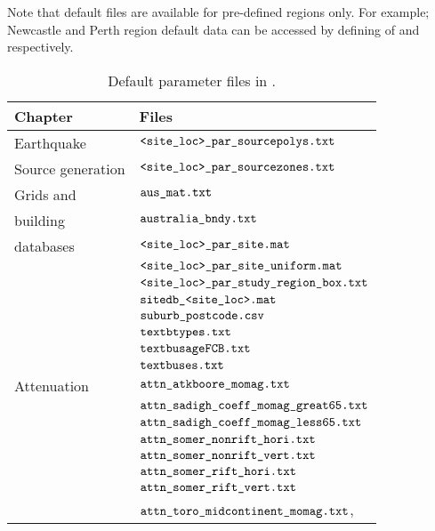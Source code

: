 Note that default files are available for pre-defined regions
only. For example; Newcastle and Perth region default data can be
accessed by defining  of \typenewc and
\typeperth respectively.

\begin{table}
\caption{Default parameter files in
.}
\label{tab:app-inputfiles} \vspace{0.8em}
\begin{tabular}{|l|p{}|}
\hline
Chapter & Files \\
\hline Earthquake & $\typeparfile{<site\_loc>}{\_par}{\_sourcepolys}{.txt}$ \\
Source generation &  $\typeparfile{<site\_loc>}{\_par}{\_sourcezones}{.txt}$ \\
\hline
Grids and & $\typeparfile{au}{s}{\_mat}{.txt}$\\
building & $\typeparfile{aust}{ralia}{\_bndy}{.txt}$\\
databases & $\typeparfile{<site\_loc>}{\_par}{\_site}{.mat}$\\
 &  $\typeparfile{<site\_loc>}{\_par\_site}{\_uniform}{.mat}$ \\
 &  $\typeparfile{<site\_loc>}{\_par\_study}{\_region\_box}{.txt}$ \\
  & $\typeparfile{sitedb}{\_<site}{\_loc>}{.mat}$ \\
 & $\typeparfile{suburb}{\_post}{code}{.csv}$\\
  & $\typeparfile{text}{b}{types}{.txt}$ \\
 & $\typeparfile{text}{busage}{FCB}{.txt}$ \\
 &  $\typeparfile{text}{b}{uses}{.txt}$ \\
\hline
Attenuation & $\typeparfile{attn}{\_atkboore}{\_momag}{.txt}$\\
 &  $\typeparfile{attn\_sadigh}{\_coeff\_momag}{\_great65}{.txt}$ \\
 &  $\typeparfile{attn\_sadigh}{\_coeff\_momag}{\_less65}{.txt}$ \\
 &  $\typeparfile{attn\_somer}{\_nonrift}{\_hori}{.txt}$ \\
 &  $\typeparfile{attn\_somer}{\_nonrift}{\_vert}{.txt}$ \\
 &  $\typeparfile{attn\_somer}{\_rift}{\_hori}{.txt}$ \\
 &  $\typeparfile{attn\_somer}{\_rift}{\_vert}{.txt}$ \\
 & $\typeparfile{attn\_toro}{\_midcontinent}{\_momag}{.txt}$,              \\

\end{tabular}
\end{table}
